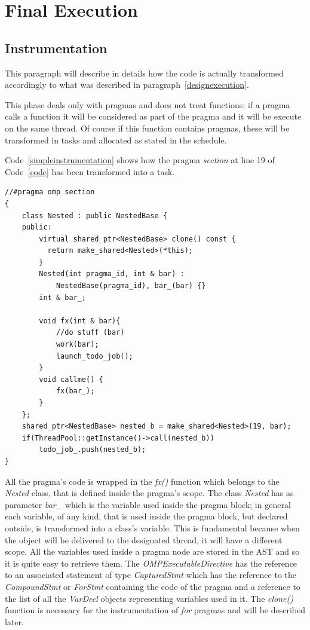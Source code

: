 \documentclass[a4paper,12pt,oneside]{book}
\begin{document}
\section{Final Execution}
\subsection{Instrumentation}
This paragraph will describe in details how the code is actually transformed accordingly to what was described in paragraph~\ref{designexecution}.

This phase deals only with pragmas and does not treat functions; if a pragma calls a function it will be considered as part of the pragma and it will be execute on the same thread. Of course if this function contains pragmas, these will be transformed in tasks and allocated as stated in the schedule.

Code~\ref{simpleinstrumentation} shows how the pragma \emph{section} at line 19 of Code~\ref{code} has been transformed into a task.

\begin{lstlisting}[language=CCC, caption=Example of an instrumented \emph{section} pragma from Code~\ref{code}., label=simpleinstrumentation]
 //#pragma omp section
{
    class Nested : public NestedBase {
    public: 
        virtual shared_ptr<NestedBase> clone() const { 
          return make_shared<Nested>(*this); 
        } 
        Nested(int pragma_id, int & bar) : 
            NestedBase(pragma_id), bar_(bar) {}
        int & bar_;
            
        void fx(int & bar){   
            //do stuff (bar)
            work(bar);
            launch_todo_job(); 
        }
        void callme() {
            fx(bar_);
        }
    };
    shared_ptr<NestedBase> nested_b = make_shared<Nested>(19, bar);                             
    if(ThreadPool::getInstance()->call(nested_b)) 
        todo_job_.push(nested_b); 
}
\end{lstlisting}

All the pragma’s code is wrapped in the \emph{fx()} function which belongs to the \emph{Nested} class, that is defined inside the pragma’s scope. The class \emph{Nested} has as parameter \emph{bar\_} which is the variable used inside the pragma block; in general each variable, of any kind, that is used inside the pragma block, but declared outside, is transformed into a class's variable. This is fundamental because when the object will be delivered to the designated thread, it will have a different scope. All the variables used inside a pragma node are stored in the AST and so it is quite easy to retrieve them. The \emph{OMPExecutableDirective} has the reference to an associated statement of type \emph{CapturedStmt} which has the reference to the \emph{CompoundStmt} or \emph{ForStmt} containing the code of the pragma and a reference to the list of all the \emph{VarDecl} objects representing variables used in it. The \emph{clone()} function is necessary for the instrumentation of \emph{for} pragmas and will be described later.
\end{document}
